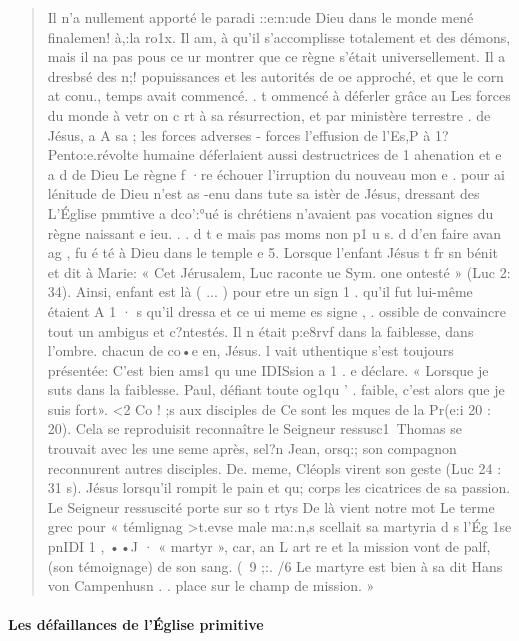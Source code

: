 \begin{quote}
    Il n'a nullement apporté le paradi ::e:n:ude Dieu dans le monde
mené finalemen! à,:la ro1x. Il am, à qu'il s'accomplisse totalement et
des démons, mais il na pas pous ce ur montrer que ce règne s'était
universellement. Il a dresbsé des n;! popuissances et les autorités de oe
approché, et que le corn at conu.,
temps avait commencé.
. t ommencé à déferler grâce au
Les forces du monde à vetr on c rt à sa résurrection, et par
ministère terrestre . de Jésus, a A sa ; les forces adverses - forces
l'effusion de l'Es,P à 1? Pento:e.révolte humaine  déferlaient aussi
destructrices de 1 ahenation et e a d de Dieu Le règne
f ·re échouer l'irruption du nouveau mon e .
pour ai lénitude
de Dieu n'est as -enu dans tute sa istèr de Jésus, dressant des
L'Église pmmtive a dco':°ué is chrétiens n'avaient pas vocation
signes du règne naissant e ieu. .
. d t e mais pas moms non p1 u s. d
d'en faire avan ag , fu é té à Dieu dans le temple e
5. Lorsque l'enfant Jésus t fr sn bénit et dit à Marie: « Cet
Jérusalem, Luc raconte ue Sym. one ontesté » (Luc 2: 34). Ainsi,
enfant est là ( ... ) pour etre un sign
1
. qu'il fut lui-même étaient
A 1 · s qu'il dressa et ce ui
meme es signe , . ossible de convaincre tout un
ambigus et c?ntestés. Il n était p:e8rvf dans la faiblesse, dans l'ombre.
chacun de co•e en, Jésus. l vait uthentique s'est toujours présentée:
C'est bien ams1 qu une IDISsion a 1
. e déclare. « Lorsque je suts
dans la faiblesse. Paul, défiant toute og1qu ' .
faible, c'est alors que je suis fort». <2 Co ! ;s aux disciples de
Ce sont les mques de la Pr(e:i 20 : 20). Cela se reproduisit
reconnaître le Seigneur ressusc1\ Thomas se trouvait avec les
une seme après, sel?n Jean, orsq:; son compagnon reconnurent
autres disciples. De. meme, Cléopls virent son geste (Luc 24 : 31 s).
Jésus lorsqu'il rompit le pain et qu; corps les cicatrices de sa passion.
Le Seigneur ressuscité porte sur so t rtys De là vient notre mot
Le terme grec pour « témlignag >t.evse male ma:.n,s scellait sa martyria
d s l'Ég 1se pnIDI 1 , ••J ·
« martyr », car, an L art re et la mission vont de palf,
(son témoignage) de son sang. (\
9
;:. /6 Le martyre est bien à sa
dit Hans von Campenhusn . .
place sur le champ de mission. »
\end{quote}

\paragraph{Les défaillances de l'Église primitive}

